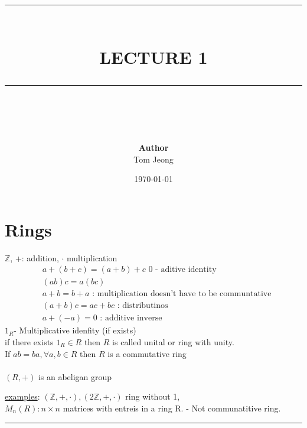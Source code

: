 \documentclass{article}
\newcommand{\HRule}[1]{\rule{\linewidth}{#1}}
\begin{document}

\title{ \normalsize \textsc{}
		\\ [2.0cm]
		\HRule{1.5pt} \\
		\LARGE \textbf{\uppercase{Lecture 1}}
		\HRule{2.0pt} \\ [0.6cm] \LARGE{}
		}

\date{\today}
\author{\textbf{Author} \\ 
		Tom Jeong
        }

\maketitle

\tableofcontents
\newpage

\section{Rings}
$\mathbb{Z}$, +: addition, $\cdot$ multiplication \\ 
\begin{align}
    &a+ (b+c) = (a+b) + c \text{ 0 - aditive identity} \\ 
    &(ab)c = a(bc) \\ 
    & a + b = b + a \text{  : multiplication doesn't have to be communtative} \\ 
    &(a +b)c = ac + bc \text{ : distributinos} \\ 
    &a + (-a) = 0 \text{ : additive inverse}
 \end{align}
$1_R$- Multiplicative idenfity (if exists) \\ if there exists $1_R \in R$ then $R$ is called unital or ring with unity. \\ 
If $ab= ba, \forall a,b \in R$ then $R$ is a commutative ring  \\  \\ 
$(R, +)$ is an abeligan group

\underline{examples}: $(\mathbb{Z}, + , \cdot), (2\mathbb{Z}, +, \cdot)$ ring without 1, \\ $M_n(R) : n \times n $ matrices with entreis in a ring R. - Not communatitive ring.
\\ 
\noindent\rule{\textwidth}{0.5pt}
\end{document}
